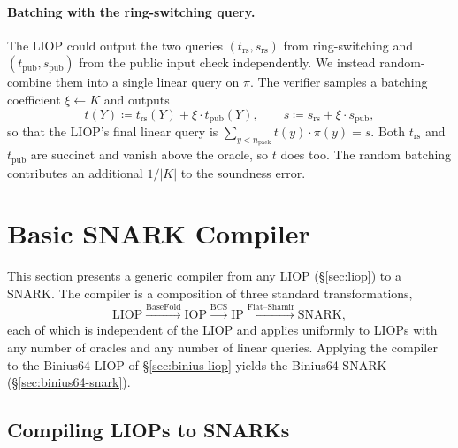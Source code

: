 \documentclass{article}
\theoremstyle{definition}
\begin{document}
\paragraph{Batching with the ring-switching query.}
The LIOP could output the two queries $(t_\text{rs}, s_\text{rs})$ from ring-switching and $(t_\text{pub}, s_\text{pub})$ from the public input check independently. We instead random-combine them into a single linear query on $\pi$. The verifier samples a batching coefficient $\xi \gets K$ and outputs
\[
  t(Y) \coloneqq t_\text{rs}(Y) + \xi \cdot t_\text{pub}(Y), \qquad s \coloneqq s_\text{rs} + \xi \cdot s_\text{pub},
\]
so that the LIOP's final linear query is $\sum_{y < n_\text{pack}} t(y) \cdot \pi(y) = s$. Both $t_\text{rs}$ and $t_\text{pub}$ are succinct and vanish above the oracle, so $t$ does too. The random batching contributes an additional $1/|K|$ to the soundness error.

\section{Basic SNARK Compiler}
\label{sec:basic-snark-compiler}

This section presents a generic compiler from any LIOP (\S\ref{sec:liop}) to a SNARK. The compiler is a composition of three standard transformations,
\[
  \text{LIOP} \xrightarrow{\text{BaseFold}} \text{IOP} \xrightarrow{\text{BCS}} \text{IP} \xrightarrow{\text{Fiat--Shamir}} \text{SNARK},
\]
each of which is independent of the LIOP and applies uniformly to LIOPs with any number of oracles and any number of linear queries. Applying the compiler to the Binius64 LIOP of \S\ref{sec:binius-liop} yields the Binius64 SNARK (\S\ref{sec:binius64-snark}).

\subsection{Compiling LIOPs to SNARKs}
\label{sec:liop-to-snark}
\end{document}
